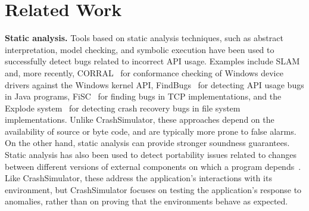 \section{Related Work} \label{sec:relatedwork}

\iffalse
While there is a vast literature on test
generation~\cite{ammann2008introduction, mcminn2004search,
  puasuareanu2009survey, dias2007survey}, much less work
has focused on issues of portability and testing whether software
behaves consistently in different environments.  Prior work on
CheckAPI~\cite{rasley2015detecting} and
NetCheck~\cite{Zhuang_NSDI_2014} begins to fill this gap and this paper
builds upon those results.
%
%


Crash reproduction by test case mutation~\cite{DBLP:conf/sigsoft/XuanXM15}.

\fi


\noindent
{\bf Static analysis. }
Tools based on static analysis techniques, such as abstract
interpretation, model checking, and symbolic execution have been used
to successfully detect bugs related to incorrect API usage. Examples
include SLAM~\cite{Ball_adecade, Ball:2002:SLP:503272.503274} and,
more recently, CORRAL~\cite{DBLP:conf/sigsoft/LalQ14} for conformance
checking of Windows device drivers against the Windows kernel API,
FindBugs~\cite{DBLP:conf/oopsla/HovemeyerP04} for detecting API usage
bugs in Java programs, FiSC~\cite{Musuvathi04modelchecking} for
finding bugs in TCP implementations, and the Explode
system~\cite{Yang:2006:ELG:1298455.1298469} for detecting crash
recovery bugs in file system implementations. Unlike CrashSimulator,
these approaches depend on the availability of source or byte code, and
are typically more prone to false alarms. On the other hand, static
analysis can provide stronger soundness guarantees.  Static analysis
has also been used to detect portability issues related to changes
between different versions of external components on which a program
depends~\cite{silakov2010improving, javacompliance-www}. Like
CrashSimulator, these address the application's interactions with its
environment, but CrashSimulator focuses on testing the application's
response to anomalies, rather than on proving that the environments
behave as expected.

